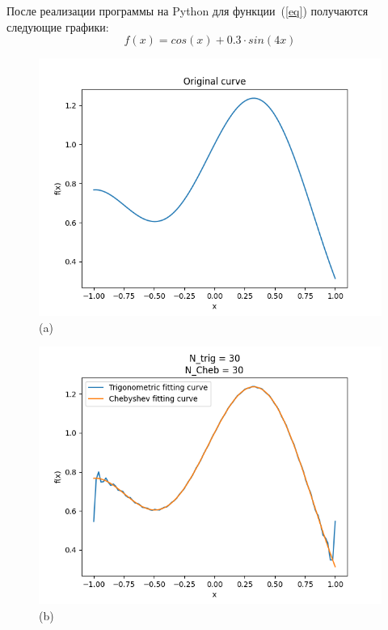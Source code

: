 После реализации программы на Python для функции~(\ref{eq}) получаются следующие графики:
\begin{equation}
    f(x) = cos(x) + 0.3 \cdot sin(4 x) \label{eq}
\end{equation}
\newpage
\begin{figure}[ht!]
\setlength{\fboxsep}{0pt}%
\setlength{\fboxrule}{0pt}%
\begin{center}
\centering
\begin{minipage}{0.45\textwidth}
\centering
 \includegraphics[width=0.95\linewidth]{Figures/Original_curve.png}\\(a)
\end{minipage}
\begin{minipage}{0.45\textwidth}
\centering
 \includegraphics[width=0.95\linewidth]{Figures/Fitting_curves.png}\\(b)

\end{minipage}
\end{center}
\end{figure}
